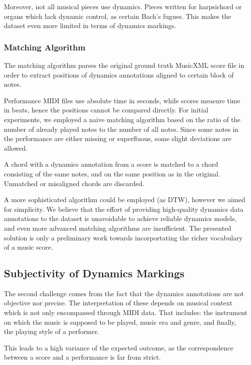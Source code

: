 Moreover, not all musical pieces use dynamics. Pieces written for harpsichord or organs which lack dynamic control, as certain Bach's fugues. This makes the dataset even more limited in terms of dynamics markings.

\subsubsection{Matching Algorithm}

The matching algorithm parses the original ground truth MusicXML score file in order to extract positions of dynamics annotations aligned to certain block of notes.

Performance MIDI files use absolute time in seconds, while scores measure time in beats, hence the positions cannot be compared directly. For initial experiments, we employed a naive matching algorithm based on the ratio of the number of already played notes to the number of all notes. Since some notes in the performance are either missing or superfluous, some slight deviations are allowed. 

A chord with a dynamics annotation from a score is matched to a chord consisting of the same notes, and on the same position as in the original. Unmatched or misaligned chords are discarded. 

A more sophisticated algorithm could be employed (as DTW), however we aimed for simplicity. We believe that the effort of providing high-quality dynamics data annotations to the dataset is unavoidable to achieve reliable dynamics models, and even more advanced matching algorithms are insufficient. The presented solution is only a preliminary work towards incorportating the richer vocabulary of a music score.

\subsection{Subjectivity of Dynamics Markings}

The second challenge comes from the fact that the dynamics annotations are not objective nor precise. The interpretation of these depends on musical context which is not only encompassed through MIDI data. That includes: the instrument on which the music is supposed to be played, music era and genre, and finally, the playing style of a performer. 

This leads to a high variance of the expected outcome, as the correspondence between a score and a performance is far from strict.

